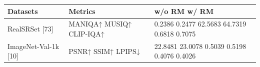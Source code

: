 \begin{tabular}{lll}
\toprule
Datasets & Metrics & w/o RM w/ RM \\
\midrule
RealSRSet [73] & MANIQA↑ MUSIQ↑ CLIP-IQA↑ & 0.2386 0.2477 62.5683 64.7319 0.6818 0.7075 \\
ImageNet-Val-1k [10] & PSNR↑ SSIM↑ LPIPS↓ & 22.8481 23.0078 0.5039 0.5198 0.4076 0.4026 \\
\bottomrule
\end{tabular}
